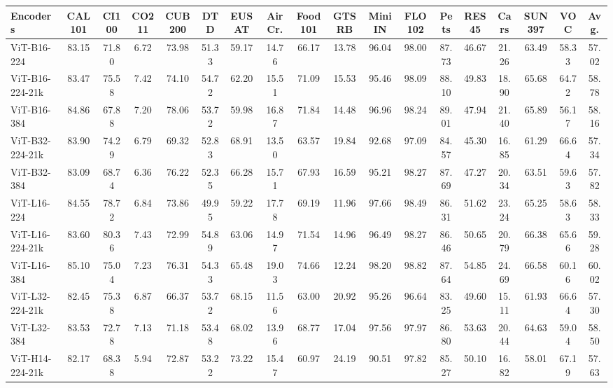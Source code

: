 \begin{tabular}{l ccccccccccccccccc}
\toprule
Encoders & CAL101 & CI100 & CO211 & CUB200 & DTD & EUSAT & AirCr. & Food101 & GTSRB & MiniIN & FLO102 & Pets & RES45 & Cars & SUN397 & VOC & Avg. \\ \hline
ViT-B16-224 & 83.15 & 71.80 & 6.72 & 73.98 & 51.33 & 59.17 & 14.76 & 66.17 & 13.78 & 96.04 & 98.00 & 87.73 & 46.67 & 21.26 & 63.49 & 58.33 & 57.02\\
ViT-B16-224-21k & 83.47 & 75.58 & 7.42 & 74.10 & 54.72 & 62.20 & 15.51 & 71.09 & 15.53 & 95.46 & 98.09 & 88.10 & 49.83 & 18.90 & 65.68 & 64.72 & 58.78\\
ViT-B16-384 & 84.86 & 67.88 & 7.20 & 78.06 & 53.72 & 59.98 & 16.87 & 71.84 & 14.48 & 96.96 & 98.24 & 89.01 & 47.94 & 21.40 & 65.89 & 56.17 & 58.16\\
ViT-B32-224-21k & 83.90 & 74.29 & 6.79 & 69.32 & 52.83 & 68.91 & 13.50 & 63.57 & 19.84 & 92.68 & 97.09 & 84.57 & 45.30 & 16.85 & 61.29 & 66.64 & 57.34\\
ViT-B32-384 & 83.09 & 68.74 & 6.36 & 76.22 & 52.35 & 66.28 & 15.71 & 67.93 & 16.59 & 95.21 & 98.27 & 87.69 & 47.27 & 20.34 & 63.51 & 59.63 & 57.82\\
ViT-L16-224 & 84.55 & 78.72 & 6.84 & 73.86 & 49.95 & 59.22 & 17.78 & 69.19 & 11.96 & 97.66 & 98.49 & 86.31 & 51.62 & 23.24 & 65.25 & 58.63 & 58.33\\
ViT-L16-224-21k & 83.60 & 80.36 & 7.43 & 72.99 & 54.89 & 63.06 & 14.97 & 71.54 & 14.96 & 96.49 & 98.27 & 86.46 & 50.65 & 20.79 & 66.38 & 65.66 & 59.28\\
ViT-L16-384 & 85.10 & 75.04 & 7.23 & 76.31 & 54.33 & 65.48 & 19.03 & 74.66 & 12.24 & 98.20 & 98.82 & 87.64 & 54.85 & 24.69 & 66.58 & 60.16 & 60.02\\
ViT-L32-224-21k & 82.45 & 75.38 & 6.87 & 66.37 & 53.72 & 68.15 & 11.56 & 63.00 & 20.92 & 95.26 & 96.64 & 83.25 & 49.60 & 15.11 & 61.93 & 66.64 & 57.30\\
ViT-L32-384 & 83.53 & 72.78 & 7.13 & 71.18 & 53.48 & 68.02 & 13.96 & 68.77 & 17.04 & 97.56 & 97.97 & 86.80 & 53.63 & 20.44 & 64.63 & 59.04 & 58.50\\
ViT-H14-224-21k & 82.17 & 68.38 & 5.94 & 72.87 & 53.22 & 73.22 & 15.47 & 60.97 & 24.19 & 90.51 & 97.82 & 85.27 & 50.10 & 16.82 & 58.01 & 67.19 & 57.63\\
\bottomrule
\end{tabular}
